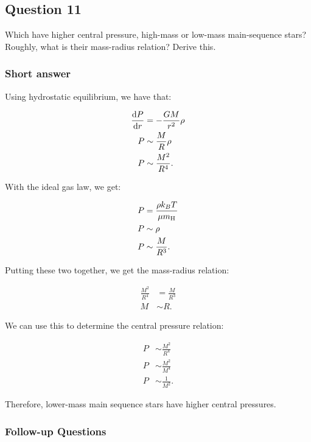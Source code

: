 \documentclass[a4paper,10pt]{article}
\begin{document}

\newpage
\subsection{Question 11}

Which have higher central pressure, high-mass or low-mass main-sequence stars? Roughly, what is their mass-radius relation? Derive this.

\subsubsection{Short answer}

Using hydrostatic equilibrium, we have that:

\begin{align*}
    \frac{{\rm d}P}{{\rm d}r} &= -\frac{GM}{r^2}\rho \\
    P &\sim \frac{M}{R}\rho \\
    P &\sim \frac{M^2}{R^4}.
\end{align*}

{\noindent}With the ideal gas law, we get:

\begin{align*}
    P &= \frac{\rho k_BT}{\mu m_{\rm H}} \\
    P &\sim \rho \\
    P &\sim \frac{M}{R^3}.
\end{align*}

{\noindent}Putting these two together, we get the mass-radius relation:

\begin{align*}
    \frac{M^2}{R^4} &= \frac{M}{R^3} \\
    M &\sim R.
\end{align*}

{\noindent}We can use this to determine the central pressure relation:

\begin{align*}
    P &\sim \frac{M^2}{R^4} \\
    P &\sim \frac{M^2}{M^4} \\
    P &\sim \frac{1}{M^2}.
\end{align*}

{\noindent}Therefore, lower-mass main sequence stars have higher central pressures.

\subsubsection{Follow-up Questions}
\end{document}
